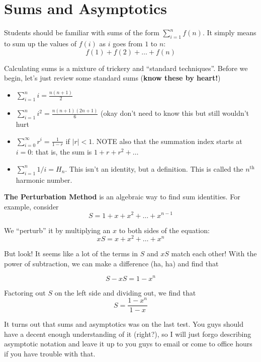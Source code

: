 \documentclass[11pt]{article}
\begin{document}
\section{Sums and Asymptotics}

Students should be familiar with sums of the form $\sum_{i=1}^n f(n)$.  It simply
means to sum up the values of $f(i)$ as $i$ goes from $1$ to $n$: 
$$f(1) + f(2) + \ldots + f(n)$$

Calculating sums is a mixture of trickery and ``standard techniques''.  Before we begin,
let's just review some standard sums (\textbf{know these by heart!})

\begin{itemize}
	\item $\sum_{i=1}^n i = \frac{n(n+1)}{2}$
	
	\item $\sum_{i=1}^n i^2 = \frac{n(n+1)(2n+1)}{6}$ (okay don't need to know this but still wouldn't hurt
	
	\item $\sum_{i=0}^{\infty} r^i =\frac{1}{1-r}$ if $|r|<1$.  NOTE also that the summation
	index starts at $i=0$: that is, the sum is $1 + r + r^2 + \ldots$
	
	\item $\sum_{i=1}^n 1/i = H_n$.  This isn't an identity, but a definition.  This is 
		called the $n^{\textrm{th}}$ harmonic number.
	
\end{itemize}

\textbf{The Perturbation Method} is an algebraic way to find sum identities.  For example, consider
$$S = 1 + x + x^2 + \ldots + x^{n-1}$$

We ``perturb'' it by multiplying an $x$ to both sides of the equation:
$$xS = x + x^2 + \ldots + x^n$$

But look!  It seems like a lot of the terms in $S$ and $xS$ match each other!  With the power of subtraction, we can make a difference (ha, ha) and find that

$$S - xS = 1 - x^n$$

Factoring out $S$ on the left side and dividing out, we find that 
$$S = \frac{1-x^n}{1-x}$$


It turns out that sums and asymptotics was on the last test.  You guys should have a decent enough understanding of it (right?), so I will just forgo describing asymptotic notation and leave it up to you guys to email or come to office hours if you have trouble with that.
\end{document}
